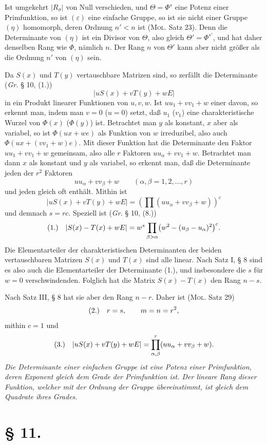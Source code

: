 \documentclass[11pt]{article}
\newcommand{\eps}{\varepsilon}
\newcommand{\fnum}[1]{\textup{(\ensuremath{#1}.)}\quad}
\begin{document}
Ist umgekehrt $|R_\sigma|$ von Null verschieden, und $\Theta=\Phi^s$ eine Potenz einer Primfunktion, so ist $(\eps)$ eine einfache Gruppe, so ist sie nicht einer Gruppe $(\eta)$ homomorph, deren Ordnung $n'<n$ ist (\textsc{Mol}. Satz 23). Denn die Determinante von $(\eta)$ ist ein Divisor von $\Theta$, also gleich $\Theta'=\Phi^{s'}$, und hat daher denselben Rang wie $\Phi$, nämlich $n$. Der Rang $n$ von $\Theta'$ kann aber nicht größer als die Ordnung $n'$ von $(\eta)$ sein.

Da $S(x)$ und $T(y)$ vertauschbare Matrizen sind, so zerfällt die Determinante (\emph{Gr.} § 10, (1.))
\[
 |uS(x)+vT(y)+wE|
\]
in ein Produkt linearer Funktionen von $u,v,w$. Ist $uu_1+vv_1+w$ einer davon, so erkennt man, indem man $v=0$ ($u=0$) setzt, daß $u_1$ ($v_1$) eine charakteristische Wurzel von $\Phi(x)$ ($\Phi(y)$) ist. Betrachtet man $y$ als konstant, $x$ aber als variabel, so ist $\Phi(ux+we)$ als Funktion von $w$ irreduzibel, also auch $\Phi(ux+(vv_1+w)e)$. Mit dieser Funktion hat die Determinante den Faktor $uu_1+vv_1+w$ gemeinsam, also alle $r$ Faktoren $uu_\alpha+vv_1+w$. Betrachtet man dann $x$ als konstant und $y$ als variabel, so erkennt man, daß die Determinante jeden der $r^2$ Faktoren
\[
 uu_\alpha+vv_\beta+w\qquad(\alpha,\beta=1,2,\ldots,r)
\]
und jeden gleich oft enthält. Mithin ist
\[
 |uS(x)+vT(y)+wE|=\left(\prod(uu_\alpha+vv_\beta+w)\right)^c
\]
und demnach $s=rc$. Speziell ist (\emph{Gr.} § 10, (8.))
\[
\fnum{1} |S(x)-T(x)+wE|=w^s\prod_{\beta>\alpha}\bigl(w^2-(u_\beta-u_\alpha)^2\bigr)^c.
\]
Die Elementarteiler der charakteristischen Determinanten der beiden vertauschbaren Matrizen $S(x)$ und $T(x)$ sind alle linear. Nach Satz I, § 8 sind es also auch die Elementarteiler der Determinante (1.), und insbesondere die $s$ für $w=0$ verschwindenden. Folglich hat die Matrix $S(x)-T(x)$ den Rang $n-s$.

Nach Satz III, § 8 hat sie aber den Rang $n-r$. Daher ist (\textsc{Mol}. Satz 29)
\[
\fnum{2} r=s,
\qquad m=n=r^2,
\]
mithin $c=1$ und
\[
\fnum{3} |uS(x)+vT(y)+wE|=\prod_{\alpha,\beta}^{r}(uu_\alpha+vv_\beta+w).
\]
\emph{Die Determinante einer einfachen Gruppe ist eine Potenz einer Primfunktion, deren Exponent gleich dem Grade der Primfunktion ist. Der lineare Rang dieser Funktion, welcher mit der Ordnung der Gruppe übereinstimmt, ist gleich dem Quadrate ihres Grades.}

\section*{§ 11.}
\end{document}
